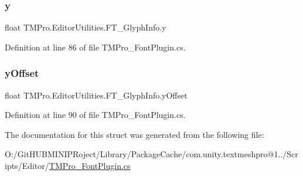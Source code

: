 \subsubsection{\texorpdfstring{y}{y}}
{\footnotesize\ttfamily float T\+M\+Pro.\+Editor\+Utilities.\+F\+T\+\_\+\+Glyph\+Info.\+y}



Definition at line 86 of file T\+M\+Pro\+\_\+\+Font\+Plugin.\+cs.

\mbox{\label{struct_t_m_pro_1_1_editor_utilities_1_1_f_t___glyph_info_afdf4f2b7cf3e2b840811d11ff3533181}} 
\subsubsection{\texorpdfstring{yOffset}{yOffset}}
{\footnotesize\ttfamily float T\+M\+Pro.\+Editor\+Utilities.\+F\+T\+\_\+\+Glyph\+Info.\+y\+Offset}



Definition at line 90 of file T\+M\+Pro\+\_\+\+Font\+Plugin.\+cs.



The documentation for this struct was generated from the following file\+:\begin{DoxyCompactItemize}
\item 
O\+:/\+Git\+H\+U\+B\+M\+I\+N\+I\+P\+Roject/\+Library/\+Package\+Cache/com.\+unity.\+textmeshpro@1../\+Scripts/\+Editor/\mbox{\hyperlink{_t_m_pro___font_plugin_8cs}{T\+M\+Pro\+\_\+\+Font\+Plugin.\+cs}}\end{DoxyCompactItemize}
